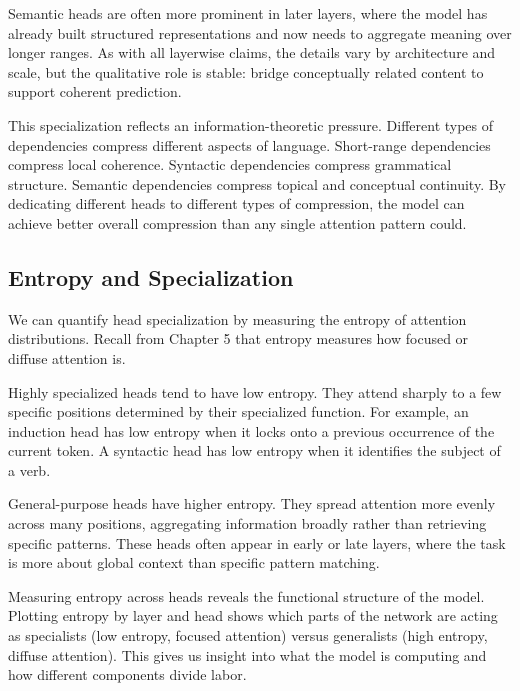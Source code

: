 Semantic heads are often more prominent in later layers, where the model has already built structured representations and now needs to aggregate meaning over longer ranges. As with all layerwise claims, the details vary by architecture and scale, but the qualitative role is stable: bridge conceptually related content to support coherent prediction.

\vspace{1em}

This specialization reflects an information-theoretic pressure. Different types of dependencies compress different aspects of language. Short-range dependencies compress local coherence. Syntactic dependencies compress grammatical structure. Semantic dependencies compress topical and conceptual continuity. By dedicating different heads to different types of compression, the model can achieve better overall compression than any single attention pattern could.

\vspace{1.5em}

\subsection{Entropy and Specialization}

We can quantify head specialization by measuring the entropy of attention distributions. Recall from Chapter 5 that entropy measures how focused or diffuse attention is.

Highly specialized heads tend to have low entropy. They attend sharply to a few specific positions determined by their specialized function. For example, an induction head has low entropy when it locks onto a previous occurrence of the current token. A syntactic head has low entropy when it identifies the subject of a verb.

General-purpose heads have higher entropy. They spread attention more evenly across many positions, aggregating information broadly rather than retrieving specific patterns. These heads often appear in early or late layers, where the task is more about global context than specific pattern matching.

\vspace{1em}

Measuring entropy across heads reveals the functional structure of the model. Plotting entropy by layer and head shows which parts of the network are acting as specialists (low entropy, focused attention) versus generalists (high entropy, diffuse attention). This gives us insight into what the model is computing and how different components divide labor.


